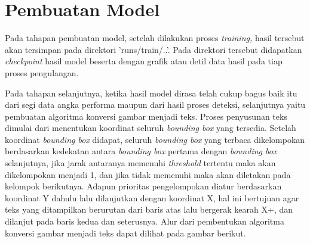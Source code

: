 \section{Pembuatan Model}
\label{sec:pembuatanmodel}

Pada tahapan pembuatan model, setelah dilakukan proses \textit{training,} hasil tersebut akan tersimpan pada direktori 'runs/train/..'. Pada direktori tersebut didapatkan \textit{checkpoint} hasil model beserta dengan grafik atau detil data hasil pada tiap proses pengulangan. \par
Pada tahapan selanjutnya, ketika hasil model dirasa telah cukup bagus baik itu dari segi data angka performa maupun dari hasil proses deteksi, selanjutnya yaitu pembuatan algoritma konversi gambar menjadi teks. Proses penyusunan teks dimulai dari menentukan koordinat seluruh \textit{bounding box} yang tersedia. Setelah koordinat \textit{bounding box} didapat, seluruh \textit{bounding box} yang terbaca dikelompokan berdasarkan kedekatan antara \textit{bounding box} pertama dengan \textit{bounding box} selanjutnya, jika jarak antaranya memenuhi \textit{threshold} tertentu maka akan dikelompokan menjadi 1, dan jika tidak memenuhi maka akan diletakan pada kelompok berikutnya. Adapun prioritas pengelompokan diatur berdasarkan koordinat Y dahulu lalu dilanjutkan dengan koordinat X, hal ini bertujuan agar teks yang ditampilkan berurutan dari baris atas lalu bergerak kearah X+, dan dilanjut pada baris kedua dan seterusnya. Alur dari pembentukan algoritma konversi gambar menjadi teks dapat dilihat pada gambar berikut. \par
